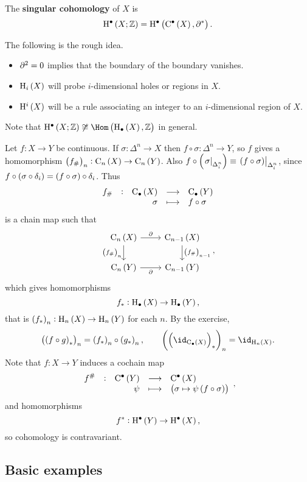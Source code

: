 \begin{definition*}
The \textbf{singular cohomology} of $ X $ is
$$ \H^\bullet\br{X; \ZZ} = \H^\bullet\br{\C^\bullet\br{X}, \da^*}. $$
\end{definition*}

The following is the rough idea.
\begin{itemize}
\item $ \partial^2 = 0 $ implies that the boundary of the boundary vanishes.
\item $ \H_i\br{X} $ will probe $ i $-dimensional holes or regions in $ X $.
\item $ \H^i\br{X} $ will be a rule associating an integer to an $ i $-dimensional region of $ X $.
\end{itemize}
Note that $ \H^\bullet\br{X; \ZZ} \not\cong \Hom\br{\H_\bullet\br{X}, \ZZ} $ in general.


\begin{remark*}
Let $ f : X \to Y $ be continuous. If $ \sigma : \Delta^n \to X $ then $ f \circ \sigma : \Delta^n \to Y $, so $ f $ gives a homomorphism $ \br{f_\#}_n : \C_n\br{X} \to \C_n\br{Y} $. Also $ f \circ \br{\eval{\sigma}_{\Delta_i^n}} \equiv \eval{\br{f \circ \sigma}}_{\Delta_i^n} $, since $ f \circ \br{\sigma \circ \delta_i} = \br{f \circ \sigma} \circ \delta_i $. Thus
$$ \function[f_\#]{\C_\bullet\br{X}}{\C_\bullet\br{Y}}{\sigma}{f \circ \sigma} $$
is a chain map such that
$$
\begin{tikzcd}
\C_n\br{X} \arrow{r}{\da} \arrow{d}[swap]{\br{f_\#}_n} & \C_{n - 1}\br{X} \arrow{d}{\br{f_\#}_{n - 1}} \\
\C_n\br{Y} \arrow{r}[swap]{\da} & \C_{n - 1}\br{Y}
\end{tikzcd},
$$
which gives homomorphisms
$$ f_* : \H_\bullet\br{X} \to \H_\bullet\br{Y}, $$
that is $ \br{f_*}_n : \H_n\br{X} \to \H_n\br{Y} $ for each $ n $. By the exercise,
$$ \br{\br{f \circ g}_*}_n = \br{f_*}_n \circ \br{g_*}_n, \qquad \br{\br{\id_{\C_\bullet\br{X}}}_*}_n = \id_{\H_n\br{X}}. $$
Note that $ f : X \to Y $ induces a cochain map
$$ \function[f^\#]{\C^\bullet\br{Y}}{\C^\bullet\br{X}}{\psi}{\br{\sigma \mapsto \psi\br{f \circ \sigma}}}, $$
and homomorphisms
$$ f^* : \H^\bullet\br{Y} \to \H^\bullet\br{X}, $$
so cohomology is contravariant.
\end{remark*}

\pagebreak

\subsection{Basic examples}

